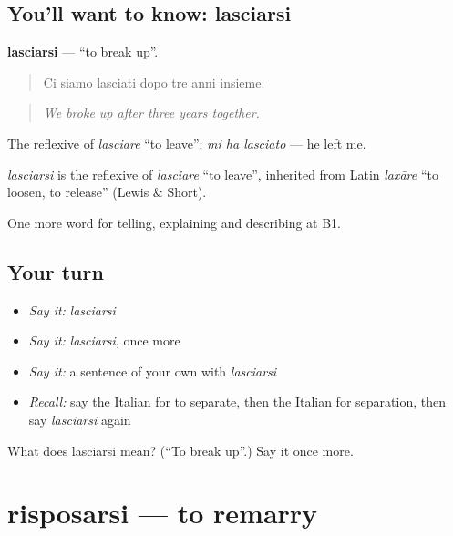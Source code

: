 \subsection*{You'll want to know: lasciarsi}
\textbf{lasciarsi} — \textquotedblleft{}to break up\textquotedblright{}.

\begin{quote}
Ci siamo lasciati dopo tre anni insieme.
\end{quote}

\begin{quote}
\emph{We broke up after three years together.}
\end{quote}

The reflexive of \emph{lasciare} \textquotedblleft{}to leave\textquotedblright{}: \emph{mi ha lasciato} — he left me.

\begin{cousinweb}
\emph{lasciarsi} is the reflexive of \emph{lasciare} \textquotedblleft{}to leave\textquotedblright{}, inherited from Latin \emph{laxāre} \textquotedblleft{}to loosen, to release\textquotedblright{} (Lewis \& Short).
\end{cousinweb}

\begin{grammarlens}[title={What you've built}]
One more word for telling, explaining and describing at B1.
\end{grammarlens}

\subsection*{Your turn}
\begin{itemize}
\raggedright
  \item \emph{Say it:} \emph{lasciarsi}
  \item \emph{Say it:} \emph{lasciarsi}, once more
  \item \emph{Say it:} a sentence of your own with \emph{lasciarsi}
  \item \emph{Recall:} say the Italian for to separate, then the Italian for separation, then say \emph{lasciarsi} again
\end{itemize}

\begin{tcolorbox}[breakable,colback=teal!4,colframe=teal!35!black,title={Before you move on}]
What does lasciarsi mean? (\textquotedblleft{}To break up\textquotedblright{}.) Say it once more.
\end{tcolorbox}
\section[risposarsi]{risposarsi — to remarry}

